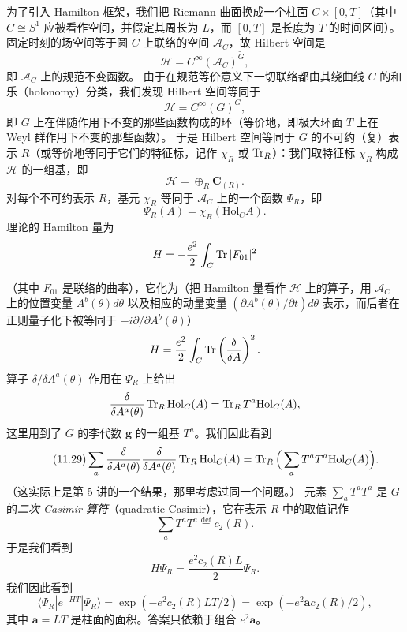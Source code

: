 为了引入 Hamilton 框架，我们把 Riemann 曲面换成一个柱面 $C\times[0,T]$（其中 $C\cong S^{1}$ 应被看作空间，并假定其周长为 $L$，而 $[0,T]$ 是长度为 $T$ 的时间区间）。
固定时刻的场空间等于圆 $C$ 上联络的空间 $\mathcal{A}_{C}$，故 Hilbert 空间是
\[
\mathcal{H}=C^{\infty}(\mathcal{A}_{C})^{\widetilde G},
\]
即 $\mathcal{A}_{C}$ 上的规范不变函数。
由于在规范等价意义下一切联络都由其绕曲线 $C$ 的和乐（holonomy）分类，我们发现 Hilbert 空间等同于
\[
\mathcal{H}=C^{\infty}(G)^{G},
\]
即 $G$ 上在伴随作用下不变的那些函数构成的环（等价地，即极大环面 $T$ 上在 Weyl 群作用下不变的那些函数）。
于是 Hilbert 空间等同于 $G$ 的不可约（复）表示 $R$（或等价地等同于它们的特征标，记作 $\chi_{R}$ 或 $\operatorname{Tr}_{R}$）：我们取特征标 $\chi_{R}$ 构成 $\mathcal{H}$ 的一组基，即
\[
\mathcal{H}=\oplus_{R}\mathbf{C}_{(R)}.
\]
对每个不可约表示 $R$，基元 $\chi_{R}$ 等同于 $\mathcal{A}_{C}$ 上的一个函数 $\Psi_{R}$，即
\[
\Psi_{R}(A)=\chi_{R}(\mathrm{Hol}_{C}A).
\]
理论的 Hamilton 量为
\[
H=-\frac{e^{2}}{2}\int_{C}\operatorname{Tr}|F_{01}|^{2}
\]

（其中 $F_{01}$ 是联络的曲率），它化为（把 Hamilton 量看作 $\mathcal{H}$ 上的算子，用 $\mathcal{A}_{C}$ 上的位置变量 $A^{b}(\theta)d\theta$ 以及相应的动量变量 $(\partial A^{b}(\theta)/\partial t)d\theta$ 表示，而后者在正则量子化下被等同于 $-i\partial/\partial A^{b}(\theta)$）
\[
H=\frac{e^{2}}{2}\int_{C}\operatorname{Tr}\left(\frac{\delta}{\delta A}\right)^{2}.
\]
算子 $\delta/\delta A^{a}(\theta)$ 作用在 $\Psi_{R}$ 上给出
\[
\frac{\delta}{\delta A^{a}(\theta)}\operatorname{Tr}_{R}\mathrm{Hol}_{C}(A)
=\operatorname{Tr}_{R}T^{a}\mathrm{Hol}_{C}(A),
\]
这里用到了 $G$ 的李代数 $\mathbf{g}$ 的一组基 $T^{a}$。我们因此看到
\begin{equation}
  \tag{11.29}
  \label{eq:11-29}
  \sum_{a}\frac{\delta}{\delta A^{a}(\theta)}\frac{\delta}{\delta A^{a}(\theta)}
  \operatorname{Tr}_{R}\mathrm{Hol}_{C}(A)=\operatorname{Tr}_{R}\Big(\sum_{a}T^{a}T^{a}\mathrm{Hol}_{C}(A)\Big).
\end{equation}
（这实际上是第 5 讲的一个结果，那里考虑过同一个问题。）
元素 $\sum_{a}T^{a}T^{a}$ 是 $G$ 的\emph{二次 Casimir 算符}（quadratic Casimir），它在表示 $R$ 中的取值记作
\[
\sum_{a}T^{a}T^{a}\overset{\mathrm{def}}{=}c_{2}(R).
\]
于是我们看到
\begin{equation}
  \tag{11.30}
  \label{eq:11-30}
  H\Psi_{R}=\frac{e^{2}c_{2}(R)L}{2}\Psi_{R}.
\end{equation}
我们因此看到
\begin{equation}
  \tag{11.31}
  \label{eq:11-31}
  \langle\Psi_{R}|e^{-HT}|\Psi_{R}\rangle
  =\exp\left(-e^{2}c_{2}(R)LT/2\right)=\exp\left(-e^{2}\mathbf{a}c_{2}(R)/2\right),
\end{equation}
其中 $\mathbf{a}=LT$ 是柱面的面积。答案只依赖于组合 $e^{2}\mathbf{a}$。

